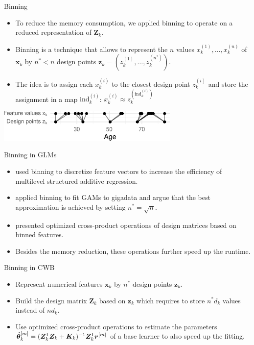 \documentclass[ignorenonframetext,]{beamer}
\providecommand{\tightlist}{%
  \setlength{\itemsep}{0pt}\setlength{\parskip}{0pt}}
\newcommand*{\tran}{{\mkern-1.5mu\mathsf{T}}}
\newcommand{\tbh}{\hat{\bm{\theta}}}
\newcommand{\xv}{\bm{x}}
\newcommand{\prv}{\bm{r}}
\newcommand{\rmm}{\prv^{[m]}}
\begin{document}
\begin{frame}{Binning}
\protect\hypertarget{binning}{}
\begin{itemize}
\tightlist
\item
  To reduce the memory consumption, we applied binning to operate on a
  reduced representation of \(\bm{Z}_k\).
\item
  Binning is a technique that allows to represent the \(n\) values
  \(x_k^{(1)}, \dots, x_k^{(n)}\) of \(\xv_k\) by \(n^\ast < n\) design
  points \(\bm{z}_k = (z_k^{(1)}, \dots, z_k^{(n^\ast)})\).
\item
  The idea is to assign each \(x_k^{(i)}\) to the closest design point
  \(z_k^{(i)}\) and store the assignment in a map
  \(\text{ind}_k^{(i)}\):
  \(x_k^{(i)} \approx z_k^{(\text{ind}_k^{(i)})}\)
\end{itemize}

\begin{center}\includegraphics[width=9cm]{figures/unnamed-chunk-3-1} \end{center}
\end{frame}

\begin{frame}{Binning in GLMs}
\protect\hypertarget{binning-in-glms}{}
\begin{itemize}
\item
  \citet{lang2014multilevel} used binning to discretize feature vectors
  to increase the efficiency of multilevel structured additive
  regression.
\item
  \citet{wood2017gigadata} applied binning to fit GAMs to gigadata and
  argue that the best approximation is achieved by setting
  \(n^\ast = \sqrt{n}\).
\item
  \citet{li2020faster} presented optimized cross-product operations of
  design matrices based on binned features.
\item
  Besides the memory reduction, these operations further speed up the
  runtime.
\end{itemize}
\end{frame}

\begin{frame}{Binning in CWB}
\protect\hypertarget{binning-in-cwb}{}
\begin{itemize}
\tightlist
\item
  Represent numerical features \(\bm{x}_k\) by \(n^\ast\) design points
  \(\bm{z}_k\).
\item
  Build the design matrix \(\bm{Z}_k\) based on \(\bm{z}_k\) which
  requires to store \(n^\ast d_k\) values instead of \(nd_k\).
\item
  Use optimized cross-product operations to estimate the parameters
  \(\tbh_k^{[m]} = (\bm{Z}_k^\tran \bm{Z}_k + \bm{K}_k)^{-1}\bm{Z}_k^\tran \rmm\)
  of a base learner to also speed up the fitting.
\end{itemize}
\end{frame}
\end{document}
